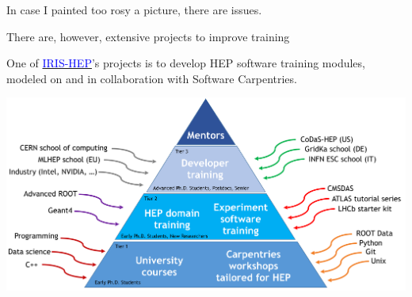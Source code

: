 \documentclass[aspectratio=169]{beamer}
\begin{document}
\begin{frame}{}
\vspace{1 cm}
\Large

\begin{center}
In case I painted too rosy a picture, there are issues.

\vspace{0.75 cm}

\vspace{0.75 cm}

\vspace{0.75 cm}
\end{center}
\end{frame}

\begin{frame}{There are, however, extensive projects to improve training}
\vspace{0.25 cm}

One of \href{https://iris-hep.org/}{\textcolor{blue}{IRIS-HEP}}'s projects is to develop HEP software training modules, modeled on and in collaboration with Software Carpentries.

\includegraphics[width=\linewidth]{PLOTS/Training-Pyramid.png}
\end{frame}
\end{document}
